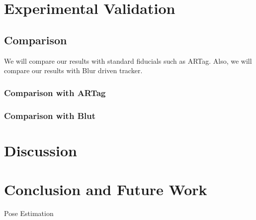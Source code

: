 \documentclass[runningheads]{llncs}
\begin{document}
\section{Experimental Validation}
\subsection{Comparison}
We will compare our results with standard fiducials such as ARTag. Also, we will
compare our results with Blur driven tracker.
\subsubsection{Comparison with ARTag}
\subsubsection{Comparison with Blut} 

\section{Discussion}

\section{Conclusion and Future Work}

Pose Estimation



\end{document}
